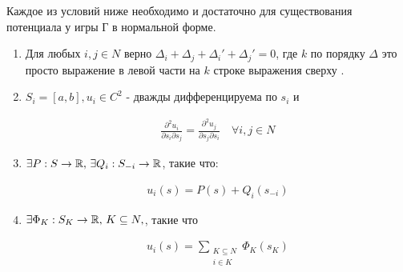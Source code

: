 \begin{thm} \label{theorem:iff_for_potential}

	Каждое из условий ниже необходимо и достаточно для существования потенциала у игры Г в нормальной форме.

	\begin{enumerate}
		\item \label{theorem_equation:iff_potential_deltas} Для любых  $i, j \in N$ верно  $\Delta_i + \Delta_j + \Delta_i' + \Delta_j' = 0$, где  $k$ по порядку  $\Delta$ это просто выражение в левой части на  $k$ строке выражения сверху .

		\item \label{theorem_equation:iff_potential_partial} $S_i = [a, b], u_i \in C^2$ - дважды дифференцируема по $s_i$ и

			\begin{align*}
				\frac{\partial^2 u_i}{\partial s_i \partial s_j} = \frac{\partial^2 u_j}{\partial s_j \partial s_i} \quad \forall i, j \in N
			\end{align*}

		\item \label{theorem_equation:iff_potential_P_Q}$\exists P: S \to \mathbb{R}, \, \exists Q_i: S_{-i} \to \mathbb{R}$, такие что:

			\begin{align*}
				u_i(s) = P(s) + Q_i(s_{-i})
			\end{align*}

		\item \label{theorem_equation:iff_potential_Phi} $\exists \Phi_K : S_K \to \mathbb{R}, \, K \subseteq N, $, такие что 

			 \begin{align*}
				 u_i(s) = \sum_{\substack{K \subseteq N \\ i \in K} }\Phi_K(s_K)
			\end{align*}

	\end{enumerate}

\end{thm}

